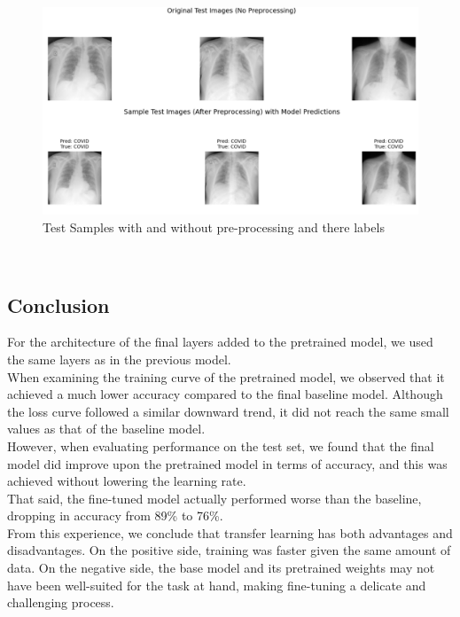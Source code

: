 \documentclass[conference]{IEEEtran}
\begin{document}
\begin{figure}[htbp]
	\centerline{\includegraphics[width=\linewidth]{Images/Transferlearning_4.png}}
	\caption{Test Samples with and without pre-processing and there labels}
	\label{fig:baseline_curves}
\end{figure}
\\


\subsection{Conclusion}
For the architecture of the final layers added to the pretrained model, we used the same layers as in the previous model.\\

When examining the training curve of the pretrained model, we observed that it achieved a much lower accuracy compared to the final baseline model. Although the loss curve followed a similar downward trend, it did not reach the same small values as that of the baseline model.\\

However, when evaluating performance on the test set, we found that the final model did improve upon the pretrained model in terms of accuracy, and this was achieved without lowering the learning rate.\\
That said, the fine-tuned model actually performed worse than the baseline, dropping in accuracy from 89\% to 76\%.\\

From this experience, we conclude that transfer learning has both advantages and disadvantages. On the positive side, training was faster given the same amount of data. On the negative side, the base model and its pretrained weights may not have been well-suited for the task at hand, making fine-tuning a delicate and challenging process.\\
\end{document}
